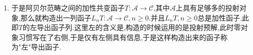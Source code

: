 \begin{enumerate}
\begin{proof}
		为说明$\tau_{n,A}$在固定$n$时是自然同构,需要验证的是对每个态射$f:A\to B$,总有如下交换图:
		$$\xymatrix{
			L_nT(A)\ar[d]_{L_nT(f)}\ar[r]^{\tau_A}&L_n'T(A)\ar[d]^{L_n'T(f)}\\
			L_nT(B)\ar[r]_{\tau_B}&L_n'T(B)}$$
		
		为此设$L_nT$定义中$A$的投射预解选取的是$(P_n)$,$B$的投射预解选取的是$(Q_n)$;在$L'_nT$定义中$A$的投射预解选取的是$(P'_n)$,$B$的投射预解选取的是$(Q_n')$.先考虑顺时针的两个映射的复合.考虑如下交换图,那么比较定理提供了提升$f1_A=f$的$(P_n)\to (Q_n')$的链映射,它诱导的同调之间的映射即顺时针两个映射的复合:
		$$\xymatrix{
			\ar[r]&P_1\ar[r]&P_0\ar[r]&A\ar[r]\ar[d]^{1_A}&0\\
			\ar[r]&P_1'\ar[r]&P_0'\ar[r]&A\ar[r]\ar[d]^{f}&0\\
			\ar[r]&Q_1'\ar[r]&Q_0'\ar[r]&B\ar[r]&0}$$
		
		同理考虑如下交换图,按照比较定理得到的提升$1_Bf=f$的$(P_n)\to(Q_n')$的链映射,所诱导的同调映射就是逆时针两个映射的复合:
		$$\xymatrix{\ar[r]&P_1\ar[r]&P_0\ar[r]&A\ar[r]\ar[d]^{f}&0\\\ar[r]&Q_1\ar[r]&Q_0\ar[r]&B\ar[r]\ar[d]^{1_B}&0\\\ar[r]&Q_1'\ar[r]&Q_0'\ar[r]&B\ar[r]&0}$$
		
		比较定理说明了$(P_n)\to(Q_n')$的提升了$f:A\to B$的链映射在同伦意义下是唯一的,另外同伦的链映射诱导了相同的同调映射,这就说明了顺时针两个映射的复合就等于逆时针两个映射的复合.这就证明了$\tau_A$构成了自然同构.
	\end{proof}
    \item 于是阿贝尔范畴之间的加性共变函子$T:\mathscr{A}\to\mathscr{C}$,其中$\mathscr{A}$上具有足够多的投射对象,那么就构造出一列函子$L_nT:\mathscr{A}\to\mathscr{C},n\ge0$.并且$L_nT,n\ge0$总是加性函子.此即$T$的左导出函子列.这里左的含义是,构造的时候运用的是投射预解,此时零对象习惯写在了右侧,于是仅有左侧具有信息,于是这样构造出来的函子称为"左"导出函子.
\end{enumerate}

